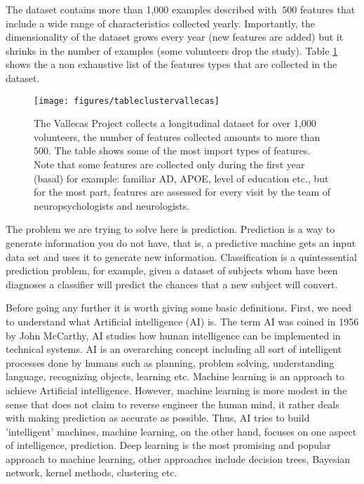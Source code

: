 \documentclass[11pt]{article}
\begin{document}
The dataset contains more than 1,000 examples described with $~500$ features that include a wide range of characteristics collected yearly. Importantly, the dimensionality of the dataset grows every year (new features are added) but it shrinks in the number of examples (some volunteers drop the study). Table \ref{fig:tableclustervallecas} shows the a non exhaustive list of the features types that are collected in the dataset.
\begin{figure}[h]
        \centering
        \texttt{[image: figures/tableclustervallecas]}
        \caption{The Vallecas Project collects a longitudinal dataset for over 1,000 volunteers, the number of features collected amounts to more than 500. The table shows some of the most import types of features. Note that some features are collected only during the first year (basal) for example: familiar AD, APOE, level of education etc., but for the most part, features are assessed for every visit by the team of neuropsychologists and neurologists.}
\label{fig:tableclustervallecas}
\end{figure}

The problem we are trying to solve here is prediction. Prediction is a way to generate information you do not have, that is, a predictive machine gets an input data set and uses it to generate new information. Classification is a quintessential prediction problem, for example, given a dataset of subjects whom have been diagnoses a classifier will predict the chances that a new subject will convert.


Before going any further it is worth giving some basic definitions. First, we need to understand what Artificial intelligence (AI) is. The term AI was coined in 1956 by John McCarthy, AI studies how human intelligence can be implemented in technical systems. AI is an overarching concept including all sort of intelligent processes done by humans such as planning, problem solving, understanding language, recognizing objects, learning etc. 
Machine learning is an approach to achieve Artificial intelligence. However, machine learning is more modest in the sense that does not claim to reverse engineer the human mind, it rather deals with making prediction as accurate as possible. Thus, AI tries to build 'intelligent' machines, machine learning, on the other hand, focuses on one aspect of intelligence, prediction.
Deep learning is the most promising and popular approach to machine learning, other approaches include decision trees, Bayesian network, kernel methods, clustering etc.
  
\end{document}
